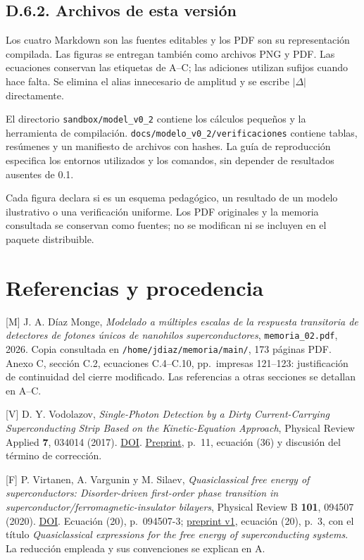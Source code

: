 \documentclass[
  spanish,
  10pt,
  a4paper,
]{article}
\begin{document}
\subsection{D.6.2. Archivos de esta
versión}\label{d.6.2.-archivos-de-esta-versiuxf3n}

Los cuatro Markdown son las fuentes editables y los PDF son su
representación compilada. Las figuras se entregan también como archivos
PNG y PDF. Las ecuaciones conservan las etiquetas de A--C; las adiciones
utilizan sufijos cuando hace falta. Se elimina el alias innecesario de
amplitud y se escribe \(|\Delta|\) directamente.

El directorio \nolinkurl{sandbox/model_v0_2} contiene los cálculos
pequeños y la herramienta de compilación.
\nolinkurl{docs/modelo_v0_2/verificaciones} contiene tablas, resúmenes y
un manifiesto de archivos con hashes. La guía de reproducción especifica
los entornos utilizados y los comandos, sin depender de resultados
ausentes de 0.1.

Cada figura declara si es un esquema pedagógico, un resultado de un
modelo ilustrativo o una verificación uniforme. Los PDF originales y la
memoria consultada se conservan como fuentes; no se modifican ni se
incluyen en el paquete distribuible.

\newpage

\section{Referencias y procedencia}\label{referencias-y-procedencia}

{[}M{]} J. A. Díaz Monge, \emph{Modelado a múltiples escalas de la
respuesta transitoria de detectores de fotones únicos de nanohilos
superconductores}, \nolinkurl{memoria_02.pdf}, 2026. Copia consultada en
\nolinkurl{/home/jdiaz/memoria/main/}, 173 páginas PDF. Anexo C, sección
C.2, ecuaciones C.4--C.10, pp.~impresas 121--123: justificación de
continuidad del cierre modificado. Las referencias a otras secciones se
detallan en A--C.

{[}V{]} D. Y. Vodolazov, \emph{Single-Photon Detection by a Dirty
Current-Carrying Superconducting Strip Based on the Kinetic-Equation
Approach}, Physical Review Applied \textbf{7}, 034014 (2017).
\href{https://doi.org/10.1103/PhysRevApplied.7.034014}{DOI}.
\href{https://arxiv.org/pdf/1611.06060}{Preprint}, p.~11, ecuación (36)
y discusión del término de corrección.

{[}F{]} P. Virtanen, A. Vargunin y M. Silaev, \emph{Quasiclassical free
energy of superconductors: Disorder-driven first-order phase transition
in superconductor/ferromagnetic-insulator bilayers}, Physical Review B
\textbf{101}, 094507 (2020).
\href{https://doi.org/10.1103/PhysRevB.101.094507}{DOI}. Ecuación (20),
p.~094507-3; \href{https://arxiv.org/pdf/1909.00992v1}{preprint v1},
ecuación (20), p.~3, con el título \emph{Quasiclassical expressions for
the free energy of superconducting systems}. La reducción empleada y sus
convenciones se explican en A.
\end{document}
